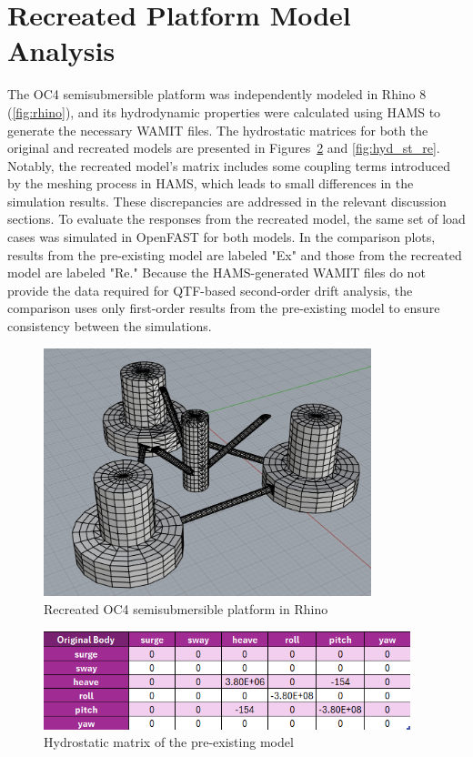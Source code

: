 \documentclass[a4paper, 11pt]{article}
\begin{document}
\section{Recreated Platform Model Analysis}

\hspace*{0.5cm}The OC4 semisubmersible platform was independently modeled in Rhino 8 (\autoref{fig:rhino}), and its hydrodynamic properties were calculated using HAMS to generate the necessary WAMIT files. The hydrostatic matrices for both the original and recreated models are presented in Figures~\ref{fig:hyd_st_org} and \ref{fig:hyd_st_re}. Notably, the recreated model’s matrix includes some coupling terms introduced by the meshing process in HAMS, which leads to small differences in the simulation results. These discrepancies are addressed in the relevant discussion sections. To evaluate the responses from the recreated model, the same set of load cases was simulated in OpenFAST for both models. In the comparison plots, results from the pre-existing model are labeled "Ex" and those from the recreated model are labeled "Re." Because the HAMS-generated WAMIT files do not provide the data required for QTF-based second-order drift analysis, the comparison uses only first-order results from the pre-existing model to ensure consistency between the simulations.

\begin{figure}[H]
    \centering
    \includegraphics[width=0.85\textwidth]{rhino.png}
    \caption{\small Recreated OC4 semisubmersible platform in Rhino}
    \label{fig:rhino}
\end{figure}

\begin{figure}[H]
    \centering
    \includegraphics[width=0.95\textwidth]{hyd_st_org.png}
    \caption{\small Hydrostatic matrix of the pre-existing model}
    \label{fig:hyd_st_org}
\end{figure}
\end{document}
